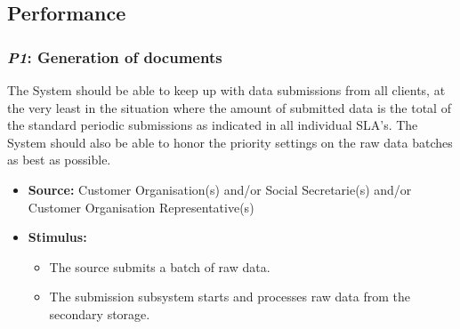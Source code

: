 \documentclass[a4paper,10pt]{article}
\begin{document}
\subsection{Performance}
\subsubsection{\emph{P1}: Generation of documents}
The System should be able to keep up with data submissions from all clients, at the very least in the situation where the amount of submitted data is the total of the standard periodic submissions as indicated in all individual SLA's. The System should also be able to honor the priority settings on the raw data batches as best as possible.

\begin{itemize}
    \item \textbf{Source:} Customer Organisation(s) and/or Social Secretarie(s) and/or Customer Organisation Representative(s)
    \item \textbf{Stimulus:}
        \begin{itemize}
            \item The source submits a batch of raw data.
            \item The submission subsystem starts and processes raw data from the secondary storage.
        \end{itemize}


\end{itemize}
\end{document}
